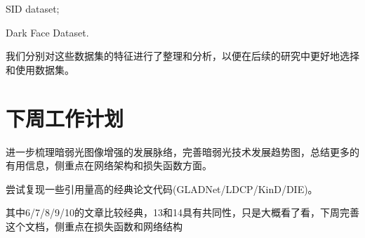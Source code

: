 \documentclass[letterpaper,12pt]{article}
\begin{document}
		SID dataset;
		
		Dark Face Dataset.
		
		我们分别对这些数据集的特征进行了整理和分析，以便在后续的研究中更好地选择和使用数据集。
		
	
	\section{下周工作计划}
	
	进一步梳理暗弱光图像增强的发展脉络，完善暗弱光技术发展趋势图，总结更多的有用信息，侧重点在网络架构和损失函数方面。

	尝试复现一些引用量高的经典论文代码(GLADNet/LDCP/KinD/DIE)。

	其中6/7/8/9/10的文章比较经典，13和14具有共同性，只是大概看了看，下周完善这个文档，侧重点在损失函数和网络结构

	
	
	
	
\end{document}
